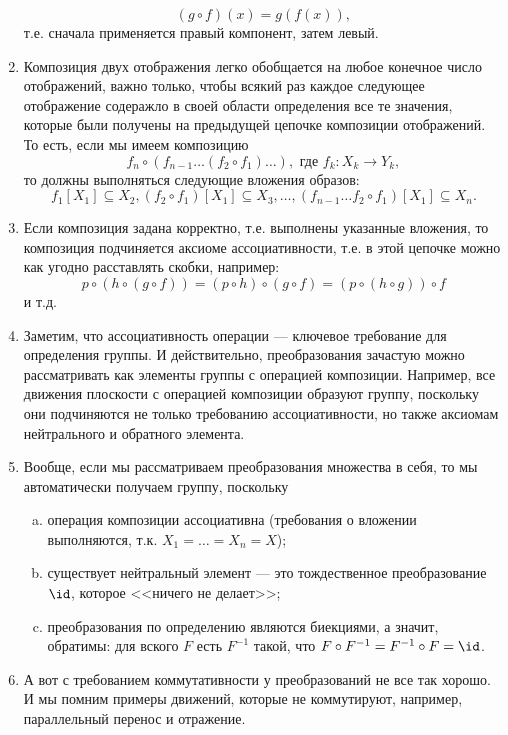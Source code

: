 \begin{enumerate}
$$
(g\circ f)(x)=g(f(x)),
$$
т.е. сначала применяется правый компонент, затем левый.
\item Композиция двух отображения легко обобщается на любое конечное число отображений, важно только, чтобы всякий раз каждое следующее отображение содеражло в своей области определения все те значения, которые были получены на предыдущей цепочке композиции отображений. То есть, если мы имеем композицию
$$
f_n\circ (f_{n-1}\dots (f_2\circ f_1)\dots),\mbox{ где }f_k:X_k\to Y_k,
$$
то должны выполняться следующие вложения образов:
$$
f_1[X_1]\subseteq X_2,(f_2\circ f_1)[X_1]\subseteq X_3,\dots,(f_{n-1}\dots f_2\circ f_1)[X_1]\subseteq X_n.
$$
\item Если композиция задана корректно, т.е. выполнены указанные вложения, то композиция подчиняется аксиоме ассоциативности, т.е. в этой цепочке можно как угодно расставлять скобки, например:
$$
p\circ (h\circ (g\circ f)) = (p\circ h)\circ (g\circ f) = (p\circ (h\circ g))\circ f
$$
и т.д.
\item Заметим, что ассоциативность операции --- ключевое требование для определения группы. И действительно, преобразования зачастую можно рассматривать как элементы группы с операцией композиции. Например, все движения плоскости с операцией композиции образуют группу, поскольку они подчиняются не только требованию ассоциативности, но также аксиомам нейтрального и обратного элемента.
\item Вообще, если мы рассматриваем преобразования множества в себя, то мы автоматически получаем группу, поскольку
\begin{enumerate}[a)]
\item операция композиции ассоциативна (требования о вложении выполняются, т.к. $X_1=\dots=X_n=X$);
\item существует нейтральный элемент --- это тождественное преобразование $\id$, которое <<ничего не делает>>;
\item преобразования по определению являются биекциями, а значит, обратимы: для вского $F$ есть $F^{-1}$ такой, что $F\circ F^{-1}=F^{-1}\circ F=\id$.
\end{enumerate}
\item А вот с требованием коммутативности у преобразований не все так хорошо. И мы помним примеры движений, которые не коммутируют, например, параллельный перенос и отражение.






\end{enumerate}
